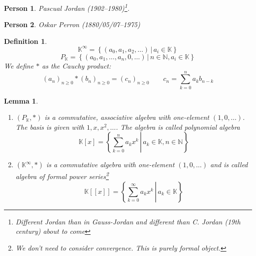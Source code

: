 \documentclass[a4paper]{article}
\newcounter{lecref}[section]
\numberwithin{lecref}{section}
\newtheorem{definition}[lecref]{Definition}
\newtheorem{lemma}[lecref]{Lemma}
\newtheorem*{Person}{Person}
\newcommand{\setdef}[2]{\left\{\left.#1\,\right|\,#2\right\}}
\begin{document}
\begin{Person}
  Pascual Jordan (1902--1980)\footnote{Different Jordan than in Gauss-Jordan and different than C. Jordan (19th century) about to come}.
\end{Person}

\begin{Person}
  Oskar Perron (1880/05/07--1975)
\end{Person}

\begin{definition} %
  \[ \mathbb K^\infty = \setdef{(a_0, a_1, a_2, \dots)}{a_i \in \mathbb K} \]
  \[ P_{\mathbb K} = \setdef{(a_0, a_1, \dots, a_n, 0, \dots)}{n \in \mathbb N, a_i \in \mathbb K} \]
  We define $*$ as the Cauchy product:
  \[ (a_n)_{n \geq 0} * (b_n)_{n \geq 0} = (c_n)_{n \geq 0} \qquad c_n = \sum_{k=0}^n a_k b_{n-k} \]
\end{definition}

\begin{lemma} %
  \label{lemma95}
  \begin{enumerate}
    \item $(P_{\mathbb K}, *)$ is a commutative, associative algebra with one-element $(1, 0, \dots)$.
      The basis is given with $1, x, x^2, \dots$. The algebra is called \emph{polynomial algebra}
      \[ \mathbb K[x] = \setdef{\sum_{k=0}^n a_k x^k}{a_k \in \mathbb K, n \in \mathbb N} \]
    \item $(\mathbb K^\infty, *)$ is a commutative algebra with one-element $(1, 0, \dots)$
      and is called \emph{algebra of formal power series}\footnote{We don't need to consider convergence. This is purely formal object.}
      \[ \mathbb K[[x]] = \setdef{\sum_{k=0}^\infty a_k x^k}{a_k \in \mathbb K} \]
  \end{enumerate}
\end{lemma}
\end{document}
